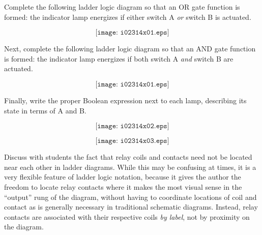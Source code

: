 

Complete the following ladder logic diagram so that an OR gate function is formed: the indicator lamp energizes if either switch A {\it or} switch B is actuated.

$$\texttt{[image: i02314x01.eps]}$$

\vskip 20pt

Next, complete the following ladder logic diagram so that an AND gate function is formed: the indicator lamp energizes if both switch A {\it and} switch B are actuated.

$$\texttt{[image: i02314x01.eps]}$$

\vskip 20pt

Finally, write the proper Boolean expression next to each lamp, describing its state in terms of A and B.







$$\texttt{[image: i02314x02.eps]}$$

$$\texttt{[image: i02314x03.eps]}$$







Discuss with students the fact that relay coils and contacts need not be located near each other in ladder diagrams.  While this may be confusing at times, it is a very flexible feature of ladder logic notation, because it gives the author the freedom to locate relay contacts where it makes the most visual sense in the ``output'' rung of the diagram, without having to coordinate locations of coil and contact as is generally necessary in traditional schematic diagrams.  Instead, relay contacts are associated with their respective coils {\it by label}, not by proximity on the diagram.




